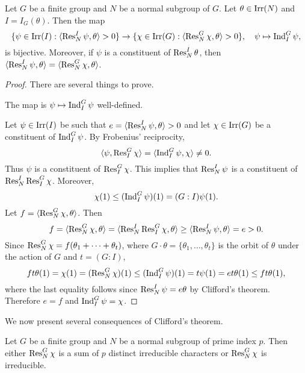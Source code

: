\begin{theorem}
    Let $G$ be a finite group and $N$ be a normal subgroup of $G$. Let $\theta\in\operatorname{Irr}(N)$ and $I=I_G(\theta)$.  Then 
    the map 
    \[
    \{\psi\in\operatorname{Irr}(I):\langle\operatorname{Res}_N^I\psi,\theta\rangle>0\}\to 
    \{\chi\in\operatorname{Irr}(G):\langle\operatorname{Res}_N^G\chi,\theta\rangle>0\},\quad 
    \psi\mapsto\operatorname{Ind}_I^G\psi,
    \]
    is bijective. Moreover, if $\psi$ is a constituent of $\operatorname{Res}_N^I\theta$, then 
    $\langle\operatorname{Res}_N^I\psi,\theta\rangle=\langle\operatorname{Res}_N^G\chi,\theta\rangle$. 
\end{theorem}

\begin{proof}
    There are several things to prove. 

    \begin{claim}
        The map is $\psi\mapsto\operatorname{Ind}_I^G\psi$ well-defined. 
    \end{claim}

    Let $\psi\in\operatorname{Irr}(I)$ be such that $e=\langle\operatorname{Res}_N^I\psi,\theta\rangle>0$ and 
    let $\chi\in\operatorname{Irr}(G)$ be a constituent of $\operatorname{Ind}_I^G\psi$. By Frobenius' reciprocity, 
    \[
    \langle\psi,\operatorname{Res}_I^G\chi\rangle=\langle\operatorname{Ind}_I^G\psi,\chi\rangle\ne0.
    \]
    Thus $\psi$ is a constituent of $\operatorname{Res}_I^G\chi$. 
    This implies that 
    $\operatorname{Res}_N^I\psi$ is a constituent of $\operatorname{Res}_N^I\operatorname{Res}_I^G\chi$. 
    Moreover, 
    \[
    \chi(1)\leq(\operatorname{Ind}_I^G\psi)(1)=(G:I)\psi(1).
    \]
    Let $f=\langle\operatorname{Res}_N^G\chi,\theta\rangle$. Then  
    \[
    f=\langle\operatorname{Res}_N^G\chi,\theta\rangle=\langle\operatorname{Res}_N^I\operatorname{Res}_I^G\chi,\theta\rangle
    \geq\langle\operatorname{Res}_N^I\psi,\theta\rangle=e>0.
    \]
    Since $\operatorname{Res}_N^G\chi=f(\theta_1+\cdots+\theta_t)$, where $G\cdot\theta=\{\theta_1,\dots,\theta_t\}$ is 
    the orbit of $\theta$ under the action of $G$ and $t=(G:I)$,  
    \[
    ft\theta(1)=\chi(1)=(\operatorname{Res}_N^G\chi)(1)\leq(\operatorname{Ind}_I^G\psi)(1)=t\psi(1)=et\theta(1)\leq ft\theta(1),
    \]
    where the last equality follows since 
    $\operatorname{Res}_N^I\psi=e\theta$ by Clifford's theorem. Therefore $e=f$ and 
    $\operatorname{Ind}_I^G\psi=\chi$. 
\end{proof}

We now present several consequences of Clifford’s theorem.

\begin{theorem}
    Let $G$ be a finite group and $N$ be a normal subgroup of prime index $p$. Then either $\operatorname{Res}_N^G\chi$ is a sum of $p$ 
    distinct irreducible characters or $\operatorname{Res}_N^G\chi$ is irreducible. 
\end{theorem}

